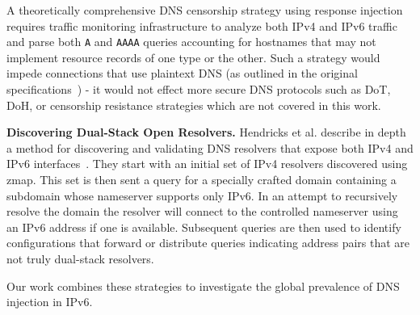 A theoretically comprehensive DNS censorship strategy using response injection
requires traffic monitoring infrastructure to analyze both IPv4 and IPv6
traffic and parse both \texttt{A} and \texttt{AAAA} queries accounting for hostnames
that may not implement resource records of one type or the other. Such a strategy
would impede connections that use plaintext DNS (as outlined in the
original specifications~\cite{RFC1035,RFC3596}) - it would not effect more secure DNS
protocols such as DoT, DoH, or censorship resistance strategies which are not
covered in this work.

\textbf{Discovering Dual-Stack Open Resolvers.}
Hendricks et al. describe in depth a method for discovering and validating DNS
resolvers that expose both IPv4 and IPv6 interfaces~\cite{hendriks2017potential}.
They start with an initial
set of IPv4 resolvers discovered using zmap. This set is then sent a query for a
specially crafted domain containing a subdomain whose nameserver supports only
IPv6. In an attempt to recursively resolve the domain the resolver will connect
to the controlled nameserver using an IPv6 address if one is available.
Subsequent queries are then used to identify configurations that forward or
distribute queries indicating address pairs that are not truly dual-stack resolvers.

Our work combines these strategies to investigate the global prevalence of DNS
injection in IPv6.